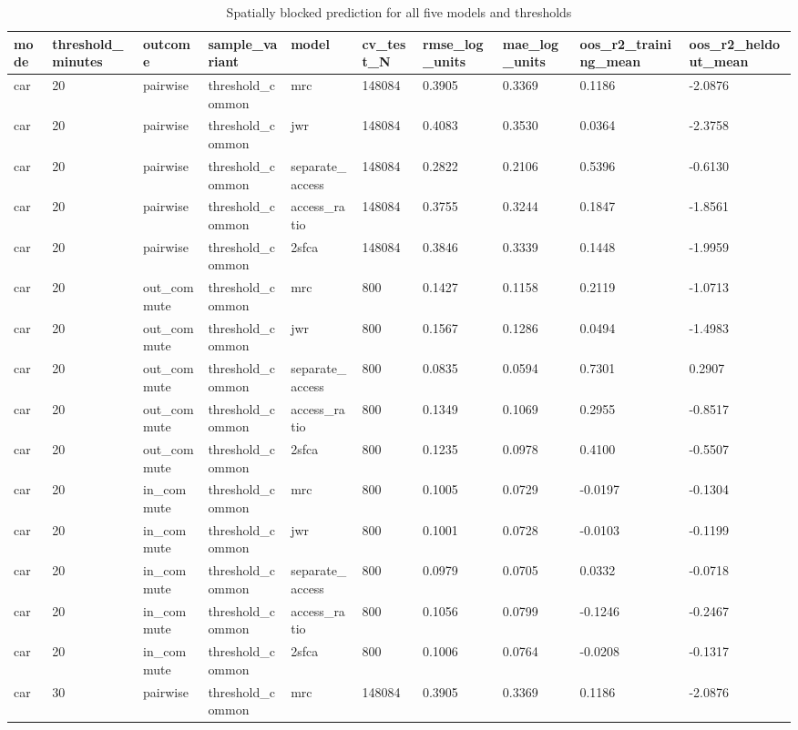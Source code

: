 \begin{table}[htbp]
\centering
\scriptsize
\caption{Spatially blocked prediction for all five models and thresholds}
\label{tab:cv-all}
\begin{tabular}{llllllllll}
\toprule
mode & threshold\_minutes & outcome & sample\_variant & model & cv\_test\_N & rmse\_log\_units & mae\_log\_units & oos\_r2\_training\_mean & oos\_r2\_heldout\_mean \\
\midrule
car & 20 & pairwise & threshold\_common & mrc & 148084 & 0.3905 & 0.3369 & 0.1186 & -2.0876 \\
car & 20 & pairwise & threshold\_common & jwr & 148084 & 0.4083 & 0.3530 & 0.0364 & -2.3758 \\
car & 20 & pairwise & threshold\_common & separate\_access & 148084 & 0.2822 & 0.2106 & 0.5396 & -0.6130 \\
car & 20 & pairwise & threshold\_common & access\_ratio & 148084 & 0.3755 & 0.3244 & 0.1847 & -1.8561 \\
car & 20 & pairwise & threshold\_common & 2sfca & 148084 & 0.3846 & 0.3339 & 0.1448 & -1.9959 \\
car & 20 & out\_commute & threshold\_common & mrc & 800 & 0.1427 & 0.1158 & 0.2119 & -1.0713 \\
car & 20 & out\_commute & threshold\_common & jwr & 800 & 0.1567 & 0.1286 & 0.0494 & -1.4983 \\
car & 20 & out\_commute & threshold\_common & separate\_access & 800 & 0.0835 & 0.0594 & 0.7301 & 0.2907 \\
car & 20 & out\_commute & threshold\_common & access\_ratio & 800 & 0.1349 & 0.1069 & 0.2955 & -0.8517 \\
car & 20 & out\_commute & threshold\_common & 2sfca & 800 & 0.1235 & 0.0978 & 0.4100 & -0.5507 \\
car & 20 & in\_commute & threshold\_common & mrc & 800 & 0.1005 & 0.0729 & -0.0197 & -0.1304 \\
car & 20 & in\_commute & threshold\_common & jwr & 800 & 0.1001 & 0.0728 & -0.0103 & -0.1199 \\
car & 20 & in\_commute & threshold\_common & separate\_access & 800 & 0.0979 & 0.0705 & 0.0332 & -0.0718 \\
car & 20 & in\_commute & threshold\_common & access\_ratio & 800 & 0.1056 & 0.0799 & -0.1246 & -0.2467 \\
car & 20 & in\_commute & threshold\_common & 2sfca & 800 & 0.1006 & 0.0764 & -0.0208 & -0.1317 \\
car & 30 & pairwise & threshold\_common & mrc & 148084 & 0.3905 & 0.3369 & 0.1186 & -2.0876 \\

\end{tabular}
\end{table}
